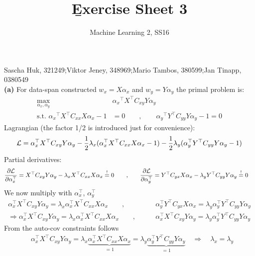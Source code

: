 \documentclass[a4paper]{article}
\DeclareMathOperator*{\argmax}{arg\,max}
\newcommand{\eqq}{  \overset{\text{!}}{=} }
\newcommand{\Yt}{{Y^\top}}
\newcommand{\Xt}{{X^\top}}
\newcommand{\lx}{{\lambda_{x}}}
\newcommand{\ly}{{\lambda_{y}}}
\newcommand{\ax}{{\alpha_{x}}}
\newcommand{\ay}{{\alpha_{y}}}
\newcommand{\axt}{\alpha_{x}^\top}
\newcommand{\ayt}{\alpha_{y}^\top}
\newcommand{\Cxx}{C_{xx}}
\newcommand{\Cxy}{C_{xy}}
\newcommand{\Cyx}{C_{yx}}
\newcommand{\Cyy}{C_{yy}}
\newcommand{\1}{\mathds{1}}
\newcommand{\lag}{\mathcal{L}}
\begin{document}
\title{\b{Exercise Sheet 3}}
\author{Machine Learning 2, SS16}

\maketitle

Sascha Huk, 321249;\quad Viktor Jeney, 348969;\quad Mario Tambos, 380599;\quad Jan Tinapp, 0380549\\


 
\textbf{(a)}
For data-span constructed $w_x = X\ax$ and $w_y = Y\ay$ the primal problem is:  
\begin{align*}
	\max_{\ax,\ay} &\ax^\top X^\top C_{xy} Y\ay \\ 
	\text{s.t. } \ax^\top X^\top C_{xx} X\ax - 1 &= 0 
	\quad\quad ,\quad\quad
	 \ay^\top Y^\top C_{yy} Y\ay - 1 = 0
\end{align*}
Lagrangian (the factor 1/2 is introduced just for convenience):
\begin{align*}
	\mathcal{L}=\axt\Xt\Cxy Y\ay - {1\over 2}\lx(\axt\Xt\Cxx X\ax - 1)
	- {1\over 2}\ly(\ayt\Yt\Cyy Y\ay - 1)
\end{align*}
Partial derivatives:
\begin{align*}
	{\partial\lag\over\partial\axt} = \Xt\Cxy Y\ay - \lx\Xt\Cxx X\ax \eqq 0
	\quad\quad ,&\quad\quad
	{\partial\lag\over\partial\ayt} = \Yt\Cyx X\ax - \ly\Yt\Cyy Y\ay \eqq 0
\end{align*}
We now multiply with $\axt$, $\ayt$
\begin{align*}
	\axt\Xt\Cxy Y\ay = \lx\axt\Xt\Cxx X\ax
	\quad\quad ,&\quad\quad
	\ayt\Yt\Cyx X\ax = \ly\ayt\Yt\Cyy Y\ay
	\\
	\Longrightarrow
	\axt\Xt\Cxy Y\ay = \lx\axt\Xt\Cxx X\ax
	\quad\quad ,&\quad\quad
	\axt\Xt\Cxy Y\ay = \ly\ayt\Yt\Cyy Y\ay	
\end{align*}
From the auto-cov constraints follows
\begin{align*}
	&\axt\Xt\Cxy Y\ay = \lx\underbrace{\axt\Xt\Cxx X\ax}_{=1} 
	= \ly\underbrace{\ayt\Yt\Cyy Y\ay}_{=1}
	\quad \Longrightarrow \quad \lx = \ly
\end{align*}
\end{document}
